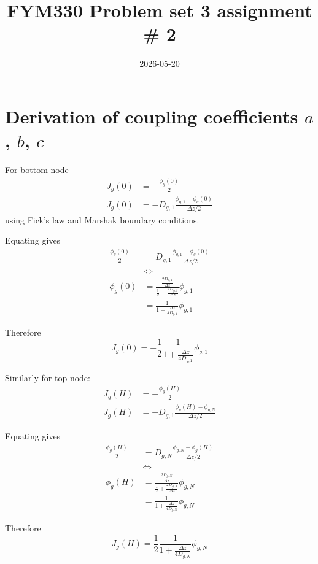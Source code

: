 \documentclass[english, a4paper, 12pt]{article}
\title{FYM330 Problem set 3 assignment \# 2}
\author{}
\date{2026-05-20}
\begin{document}
\maketitle

\section{Derivation of coupling coefficients $a$, $b$, $c$}
For bottom node
\begin{align*}
    J_g(0) &= -\frac{\phi_g(0)}{2} \\
    J_g(0) &= -D_{g,1} \frac{\phi_{g,1}-\phi_g(0)}{\Delta z/2}
\end{align*}
using Fick's law and Marshak boundary conditions.

Equating gives
\begin{align*}
    \frac{\phi_g(0)}{2} &= D_{g,1} \frac{\phi_{g,1}-\phi_g(0)}{\Delta z/2} \\
    &\Leftrightarrow \\
    \phi_g(0) &= \frac{\frac{2D_{g,1}}{\Delta z}}{\frac{1}{2} + \frac{2D_{g,1}}{\Delta z} } \phi_{g,1} \\
    &= \frac{1}{1 + \frac{\Delta z}{4D_{g,1}}} \phi_{g,1}
\end{align*}

Therefore
\begin{equation}
    J_g(0) = -\frac{1}{2}\frac{1}{1 + \frac{\Delta z}{4D_{g,1}}} \phi_{g,1}
\end{equation}

Similarly for top node:
\begin{align*}
    J_g(H) &= +\frac{\phi_g(H)}{2} \\
    J_g(H) &= -D_{g,1} \frac{\phi_{g}(H)-\phi_{g,N}}{\Delta z/2}
\end{align*}

Equating gives
\begin{align*}
    \frac{\phi_g(H)}{2} &= D_{g,N} \frac{\phi_{g,N}-\phi_g(H)}{\Delta z/2} \\
    &\Leftrightarrow \\
    \phi_g(H) &= \frac{\frac{2D_{g,N}}{\Delta z}}{\frac{1}{2} + \frac{2D_{g,N}}{\Delta z} } \phi_{g,N} \\
    &= \frac{1}{1 + \frac{\Delta z}{4D_{g,N}}} \phi_{g,N}
\end{align*}

Therefore
\begin{equation}
    J_g(H) = \frac{1}{2}\frac{1}{1 + \frac{\Delta z}{4D_{g,N}}} \phi_{g,N}
\end{equation}
\end{document}
